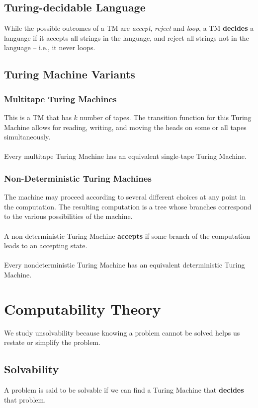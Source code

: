 \documentclass{article}
\begin{document}
\subsection{Turing-decidable Language}
While the possible outcomes of a TM are \textit{accept}, \textit{reject} and \textit{loop}, a TM \textbf{decides} a language if it accepts all strings in the language, and reject all strings not in the language -- i.e., it never loops.

\subsection{Turing Machine Variants}
\subsubsection{Multitape Turing Machines}
This is a TM that has $k$ number of tapes. The transition function for this Turing Machine allows for reading, writing, and moving the heads on some or all tapes simultaneously. \\ \\
Every multitape Turing Machine has an equivalent single-tape Turing Machine.

\subsubsection{Non-Deterministic Turing Machines}
The machine may proceed according to several different choices at any point in the computation. The resulting computation is a tree whose branches correspond to the various possibilities of the machine. \\ \\
A non-deterministic Turing Machine \textbf{accepts} if some branch of the computation leads to an accepting state. \\ \\
Every nondeterministic Turing Machine has an equivalent deterministic Turing Machine.

\section{Computability Theory}
We study unsolvability because knowing a problem cannot be solved helps us restate or simplify the problem.

\subsection{Solvability}
A problem is said to be solvable if we can find a Turing Machine that \textbf{decides} that problem.
\end{document}
